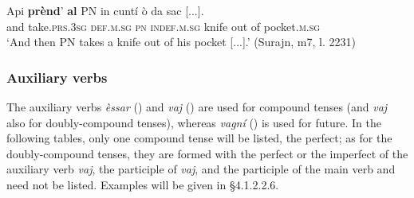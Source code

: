 \ea
\label{ex:euph3}
\gll  Api \textbf{prènd}’ \textbf{al} \textsc{PN} in cuntí ò da sac [...].\\
and take.\textsc{prs.3sg} \textsc{def.m.sg} \textsc{pn} \textsc{indef.m.sg} knife out of pocket.\textsc{m.sg}\\
\glt `And then \textsc{PN} takes a knife out of his pocket [...].' (Surajn, m7, l. 2231)
\z


\subsubsection{Auxiliary verbs}
The auxiliary verbs \textit{èssar} () and \textit{vaj} () are used for compound tenses (and \textit{vaj} also for doubly-compound tenses), whereas \textit{vagní} () is used for future. In the following tables, only one compound tense will be listed, the perfect; as for the doubly-compound tenses, they are formed with the perfect or the imperfect of the auxiliary verb \textit{vaj}, the participle of \textit{vaj}, and the participle of the main verb and need not be listed. Examples will be given in §4.1.2.2.6.

